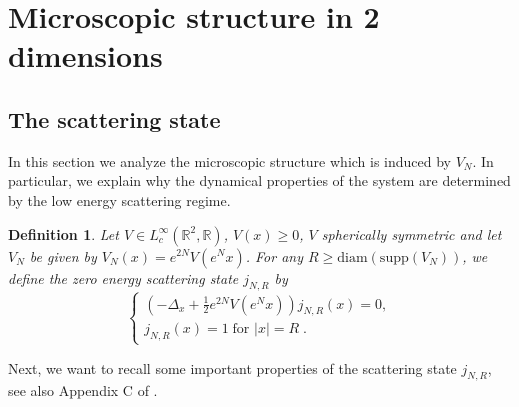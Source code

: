 \documentclass[11pt, english, american]{article}
\newtheorem{definition}[theorem] {Definition}
\begin{document}
\section{Microscopic structure in 2 dimensions}
\label{secmic}


\subsection{The scattering state}

In this section we analyze the microscopic structure which is induced by $V_N$. In particular, we explain why the dynamical properties of the system are determined by the low energy scattering regime.


\begin{definition}
Let $V \in L^\infty_c(\mathbb{R}^2, \mathbb{R})$, $V(x) \geq 0$, $V$ spherically symmetric and let $V_N$ be given by $V_N(x) = e^{2N} V(e^N x)$.
For any $R \geq \text{diam}(\text{supp} (V_N))$,
we define the zero energy scattering state $j_{N,R}$ by
\begin{equation}
\label{eq: defj}
\begin{cases} 
\left( - \Delta_x + \frac{1}{2}e^{2N} V(e^N x)  \right) j_{N,R}(x)=0 ,
\\
j_{N,R}(x)=1 \; \text{for } |x| = R \;.
  \end{cases}
\end{equation}

\end{definition}







Next, we want to recall some important properties of the scattering state $j_{N,R}$, see also Appendix C of \cite{lssy}.
\end{document}
